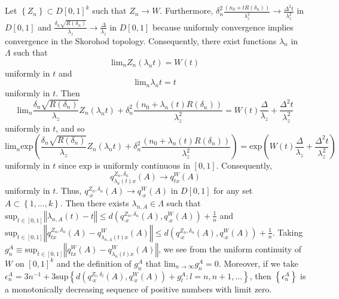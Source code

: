 \documentclass[11pt,english]{article}
\begin{document}
Let $\left\{ Z_{n}\right\} \subset D\left[0,1\right]^{k}$ such that
$Z_{n}\rightarrow W$. Furthermore, $\delta_{n}^{2}\frac{\left(n_{0}+tR\left(\delta_{n}\right)\right)}{\lambda_{z}^{2}}\rightarrow\frac{\Delta^{2}t}{\lambda_{z}^{2}}$
in $D\left[0,1\right]$ and $\frac{\delta_{n}\sqrt{R\left(\delta_{n}\right)}}{\lambda_{z}}\rightarrow\frac{\Delta}{\lambda_{z}}$
in $D\left[0,1\right]$ because uniformly convergence implies convergence
in the Skorohod topology. Consequently, there exist functions $\lambda_{n}$
in $\Lambda$ such that 
\[
\mbox{lim}_{n}Z_{n}\left(\lambda_{n}t\right)=W\left(t\right)
\]
uniformly in $t$ and
\[
\mbox{lim}_{n}\lambda_{n}t=t
\]
uniformly in $t$. Then
\[
\mbox{lim}_{n}\frac{\delta_{n}\sqrt{R\left(\delta_{n}\right)}}{\lambda_{z}}Z_{n}\left(\lambda_{n}t\right)+\delta_{n}^{2}\frac{\left(n_{0}+\lambda_{n}\left(t\right)R\left(\delta_{n}\right)\right)}{\lambda_{z}^{2}}=W\left(t\right)\frac{\Delta}{\lambda_{z}}+\frac{\Delta^{2}t}{\lambda_{z}^{2}}
\]
uniformly in $t$, and so
\[
\mbox{lim}_{n}\mbox{exp}\left(\frac{\delta_{n}\sqrt{R\left(\delta_{n}\right)}}{\lambda_{z}}Z_{n}\left(\lambda_{n}t\right)+\delta_{n}^{2}\frac{\left(n_{0}+\lambda_{n}\left(t\right)R\left(\delta_{n}\right)\right)}{\lambda_{z}^{2}}\right)=\mbox{exp}\left(W\left(t\right)\frac{\Delta}{\lambda_{z}}+\frac{\Delta^{2}t}{\lambda_{z}^{2}}\right)
\]
uniformly in $t$ since $\mbox{exp}$ is uniformly continuous in $\left[0,1\right]$.
Consequently,
\[
q_{\lambda_{n}\left(t\right)x}^{Z_{n},\delta_{n}}\left(A\right)\rightarrow q_{tx}^{W}\left(A\right)
\]
uniformly in $t$. Thus, $q_{\cdot x}^{Z_{n},\delta_{n}}\left(A\right)\rightarrow q_{\cdot x}^{W}\left(A\right)$
in $D\left[0,1\right]$ for any set $A\subset\left\{ 1,\ldots,k\right\} $.
Then there exists $\lambda_{n,A}\in\Lambda$ such that $\mbox{sup}_{t\in\left[0,1\right]}\left\Vert \lambda_{n,A}\left(t\right)-t\right\Vert \leq d\left(q_{\cdot x}^{Z_{n},\delta_{n}}\left(A\right),q_{\cdot x}^{W}\left(A\right)\right)+\frac{1}{n}$
and $\mbox{sup}_{t\in\left[0,1\right]}\left\Vert q_{tx}^{Z_{n},\delta_{n}}\left(A\right)-q_{\lambda_{n,A}\left(t\right)x}^{W}\left(A\right)\right\Vert \leq d\left(q_{\cdot x}^{Z_{n},\delta_{n}}\left(A\right),q_{\cdot x}^{W}\left(A\right)\right)+\frac{1}{n}$.
Taking $g_{n}^{A}\equiv\mbox{sup}_{t\in\left[0,1\right]}\left\Vert q_{tx}^{W}\left(A\right)-q_{\lambda_{n}\left(t\right)x}^{W}\left(A\right)\right\Vert $,
we see from the uniform continuity of $W$ on $\left[0,1\right]^{k}$
and the definition of $g_{n}^{A}$ that $\mbox{lim}_{n\rightarrow\infty}g_{n}^{A}=0.$
Moreover, if we take $\epsilon_{n}^{A}=3n^{-1}+3\mbox{sup}\left\{ d\left(q_{\cdot x}^{Z_{l},\delta_{l}}\left(A\right),q_{\cdot x}^{W}\left(A\right)\right)+g_{l}^{A}:l=n,n+1,\ldots\right\} $,
then $\left\{ \epsilon_{n}^{A}\right\} $ is a monotonically decreasing
sequence of positive numbers with limit zero.
\end{document}
